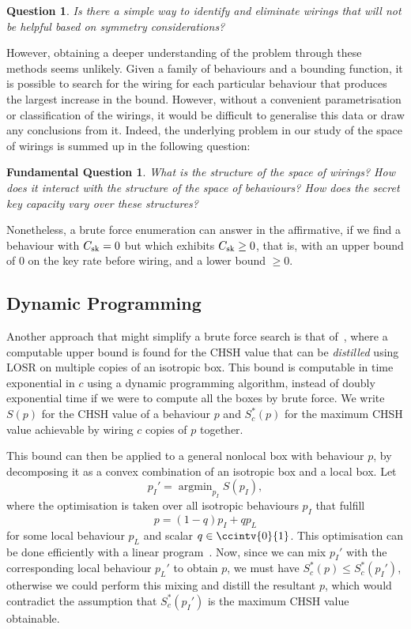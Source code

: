 \documentclass[10pt, a4paper]{article}
\numberwithin{equation}{section} %
\theoremstyle{definition}
\theoremstyle{plain}
\newtheorem{question}{Question}
\newtheorem{funqn}{Fundamental Question}
\DeclareMathOperator*{\argmin}{argmin}
\newcommand{\?}{\mathrel{?}} %
\newcommand{\sk}{\rm sk}
\begin{document}
      \begin{question}
        Is there a simple way to identify and eliminate wirings that will not be helpful based on symmetry considerations?
      \end{question}

      However, obtaining a deeper understanding of the problem through these methods seems unlikely. Given a family of behaviours and a bounding function, it is possible to search for the wiring for each particular behaviour that produces the largest increase in the bound. However, without a convenient parametrisation or classification of the wirings, it would be difficult to generalise this data or draw any conclusions from it. Indeed, the underlying problem in our study of the space of wirings is summed up in the following question:
      \begin{funqn}\label{fqn:wir}
        What is the structure of the space of wirings? How does it interact with the structure of the space of behaviours? How does the secret key capacity vary over these structures?
      \end{funqn}

      Nonetheless, a brute force enumeration can answer  in the affirmative, if we find a behaviour with \(C_{\sk} = 0\) but which exhibits \(C_{\sk} \geq 0\), that is, with an upper bound of 0 on the key rate before wiring, and a lower bound \(\geq 0\).

      \subsection{Dynamic Programming}

      Another approach that might simplify a brute force search is that of~\cite{DistillationBounds}, where a computable upper bound is found for the CHSH value that can be \emph{distilled} using LOSR on multiple copies of an isotropic box. This bound is computable in time exponential in \(c\) using a dynamic programming algorithm, instead of doubly exponential time if we were to compute all the boxes by brute force. We write \(S(p)\) for the CHSH value of a behaviour \(p\) and \(S^*_c(p)\) for the maximum CHSH value achievable by wiring \(c\) copies of \(p\) together.

      This bound can then be applied to a general nonlocal box with behaviour \(p\), by decomposing it as a convex combination of an isotropic box and a local box. Let
      \[ p_I' = \argmin_{p_I} S(p_I), \]
      where the optimisation is taken over all isotropic behaviours \(p_I\) that fulfill
      \[ p = (1-q)p_I + qp_L \]
      for some local behaviour \(p_L\) and scalar \(q \in\ccintv{0}{1}\). This optimisation can be done efficiently with a linear program~\cite{LocalPartLP}. Now, since we can mix \(p_I'\) with the corresponding local behaviour \(p_L'\) to obtain \(p\), we must have \(S^*_c(p) \leq S^*_c(p_I')\), otherwise we could perform this mixing and distill the resultant \(p\), which would contradict the assumption that \(S^*_c(p_I')\) is the maximum CHSH value obtainable.
\end{document}
